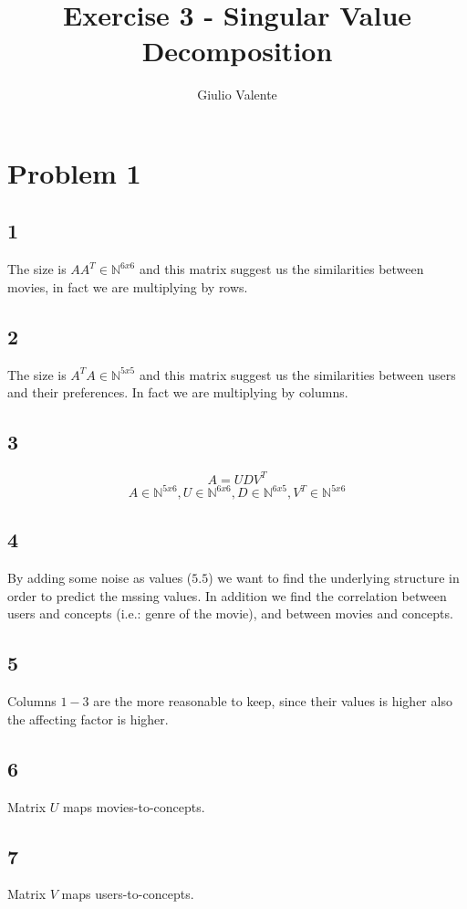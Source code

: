 \documentclass{article}
\author{Giulio Valente}
\title{Exercise 3 - Singular Value Decomposition}
\begin{document}
\date{}
\maketitle

\section{Problem 1}
\subsection{1}
The size is $AA^T\in\mathbb N^{6x6}$ and this matrix suggest us the similarities between movies,
in fact we are multiplying by rows.

\subsection{2}
The size is $A^TA\in\mathbb N^{5x5}$ and this matrix suggest us the similarities between users and their preferences.
In fact we are multiplying by columns.

\subsection{3}
$$A = UDV^T$$
$$A\in\mathbb N^{5x6}, U\in\mathbb N^{6x6}, D\in\mathbb N^{6x5}, V^T\in\mathbb N^{5x6}$$

\subsection{4}
By adding some noise as values ($5.5$) we want to find the underlying structure in order to predict the mssing
values. In addition we find the correlation between users and concepts (i.e.: genre of the movie), and between
movies and concepts.

\subsection{5}
Columns $1-3$ are the more reasonable to keep, since their values is higher also the affecting factor is higher.

\subsection{6}
Matrix $U$ maps movies-to-concepts.

\subsection{7}
Matrix $V$ maps users-to-concepts.
\end{document}

